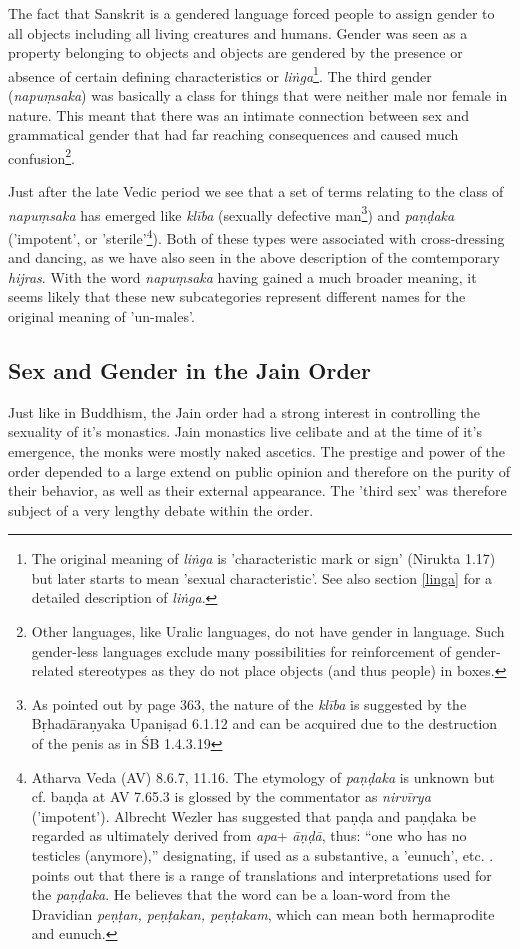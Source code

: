 The fact that Sanskrit is a gendered language forced people to assign gender to all objects including all living creatures and humans. Gender was seen as a property belonging to objects and objects are gendered by the presence or absence of certain defining characteristics or {\em liṅga}\footnote{The original meaning of {\em liṅga} is 'characteristic mark or sign' (Nirukta 1.17) but later starts to mean 'sexual characteristic'. See also section \ref{linga} for a detailed description of {\em liṅga}.}. The third gender ({\em napuṃsaka}) was basically a class for things that were neither male nor female in nature. This meant that there was an intimate connection between sex and grammatical gender that had far reaching consequences and caused much confusion\footnote{Other languages, like Uralic languages, do not have gender in language. Such gender-less languages exclude many possibilities for reinforcement of gender-related stereotypes as they do not place objects (and thus people) in boxes.}. 

Just after the late Vedic period we see that a set of terms relating to the class of {\em napuṃsaka} has emerged like {\em klība} (sexually defective man\footnote{As pointed out by \cite{zwilling} page 363, the nature of the {\em klība} is suggested by the Bṛhadāraṇyaka Upaniṣad 6.1.12 and can be acquired due to the destruction of the penis as in ŚB 1.4.3.19}) and {\em paṇḍaka} ('impotent', or 'sterile'\footnote{Atharva Veda (AV) 8.6.7, 11.16. The etymology of {\em paṇḍaka} is unknown but cf. baṇḍa at AV 7.65.3 is glossed by the commentator as {\em nirvīrya} ('impotent'). Albrecht Wezler has suggested that paṇḍa and paṇḍaka be regarded as ultimately derived from {\em *apa}+ {\em āṇḍā}, thus: “one who has no testicles (anymore),” designating, if used as a substantive, a 'eunuch', etc. \cite{wezler}. \cite{bomhard} points out that there is a range of translations and interpretations used for the {\em paṇḍaka}. He believes that the word can be a loan-word from the Dravidian {\em peṇṭan, peṇṭakan, peṇṭakam}, which can mean both hermaprodite and eunuch.}). Both of these types were associated with cross-dressing and dancing, as we have also seen in the above description of the comtemporary {\em hijras}. With the word {\em napuṃsaka} having gained a much broader meaning, it seems likely that these new subcategories represent different names for the original meaning of 'un-males'.

\subsection{Sex and Gender in the Jain Order}
Just like in Buddhism, the Jain order had a strong interest in controlling the sexuality of it's monastics. Jain monastics live celibate and at the time of it's emergence, the monks were mostly naked ascetics. The prestige and power of the order depended to a large extend on public opinion and therefore on the purity of their behavior, as well as their external appearance. The 'third sex' was therefore subject of a very lengthy debate within the order. 

